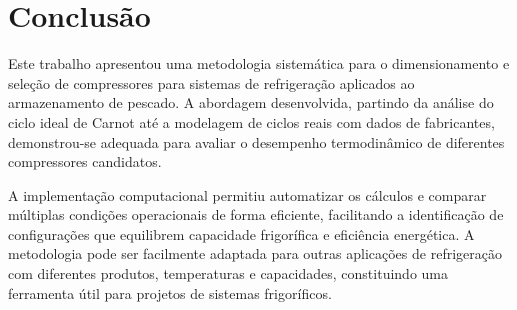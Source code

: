 \chapter{Conclusão}

Este trabalho apresentou uma metodologia sistemática para o dimensionamento e seleção de compressores para sistemas de refrigeração aplicados ao armazenamento de pescado. A abordagem desenvolvida, partindo da análise do ciclo ideal de Carnot até a modelagem de ciclos reais com dados de fabricantes, demonstrou-se adequada para avaliar o desempenho termodinâmico de diferentes compressores candidatos.

A implementação computacional permitiu automatizar os cálculos e comparar múltiplas condições operacionais de forma eficiente, facilitando a identificação de configurações que equilibrem capacidade frigorífica e eficiência energética. A metodologia pode ser facilmente adaptada para outras aplicações de refrigeração com diferentes produtos, temperaturas e capacidades, constituindo uma ferramenta útil para projetos de sistemas frigoríficos.